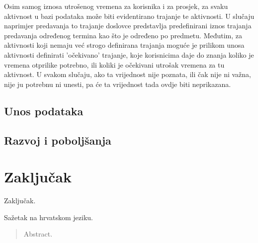 \documentclass[times, utf8, zavrsni]{fer}
\begin{document}
Osim samog iznosa utrošenog vremena za korisnika i za prosjek, za svaku aktivnost u bazi podataka može biti evidentirano trajanje te aktivnosti. U slučaju naprimjer predavanja to trajanje doslovce predstavlja predefinirani iznos trajanja predavanja određenog termina kao što je određeno po predmetu. Međutim, za aktivnosti koji nemaju već strogo definirana trajanja moguće je prilikom unosa aktivnosti definirati 'očekivano' trajanje, koje korisnicima daje do znanja koliko je vremena otprilike potrebno, ili koliki je očekivani utrošak vremena za tu aktivnost. U svakom slučaju, ako ta vrijednost nije poznata, ili čak nije ni važna, nije ju potrebnu ni unesti, pa će ta vrijednost tada ovdje biti neprikazana.

\section{Unos podataka}
\section{Razvoj i poboljšanja}

\chapter{Zaključak}
Zaključak.




\begin{sazetak}
Sažetak na hrvatskom jeziku.

\end{sazetak}

\begin{abstract}
Abstract.

\end{abstract}
\end{document}
